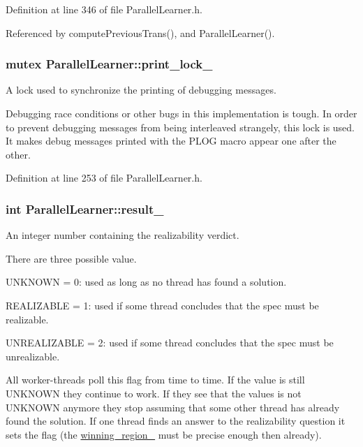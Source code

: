 Definition at line 346 of file Parallel\-Learner.\-h.



Referenced by compute\-Previous\-Trans(), and Parallel\-Learner().

\hypertarget{classParallelLearner_a5bc71a2c35fa976d792bf0e80de31a39}{
\subsubsection[{print\-\_\-lock\-\_\-}]{\setlength{\rightskip}{0pt plus 5cm}mutex Parallel\-Learner\-::print\-\_\-lock\-\_\-\hspace{0.3cm}{\ttfamily [static]}}}\label{classParallelLearner_a5bc71a2c35fa976d792bf0e80de31a39}


A lock used to synchronize the printing of debugging messages. 

Debugging race conditions or other bugs in this implementation is tough. In order to prevent debugging messages from being interleaved strangely, this lock is used. It makes debug messages printed with the P\-L\-O\-G macro appear one after the other. 

Definition at line 253 of file Parallel\-Learner.\-h.

\hypertarget{classParallelLearner_a757f8817809cce5c0408cdc41d6db1b8}{
\subsubsection[{result\-\_\-}]{\setlength{\rightskip}{0pt plus 5cm}int Parallel\-Learner\-::result\-\_\-}}\label{classParallelLearner_a757f8817809cce5c0408cdc41d6db1b8}


An integer number containing the realizability verdict. 

There are three possible value. 
\begin{DoxyItemize}
\item U\-N\-K\-N\-O\-W\-N = 0\-: used as long as no thread has found a solution. 
\item R\-E\-A\-L\-I\-Z\-A\-B\-L\-E = 1\-: used if some thread concludes that the spec must be realizable. 
\item U\-N\-R\-E\-A\-L\-I\-Z\-A\-B\-L\-E = 2\-: used if some thread concludes that the spec must be unrealizable. 
\end{DoxyItemize}All worker-\/threads poll this flag from time to time. If the value is still U\-N\-K\-N\-O\-W\-N they continue to work. If they see that the values is not U\-N\-K\-N\-O\-W\-N anymore they stop assuming that some other thread has already found the solution. If one thread finds an answer to the realizability question it sets the flag (the \hyperlink{classParallelLearner_a7c8383543ff98d7a0356a237756dcdd6}{winning\-\_\-region\-\_\-} must be precise enough then already). 

